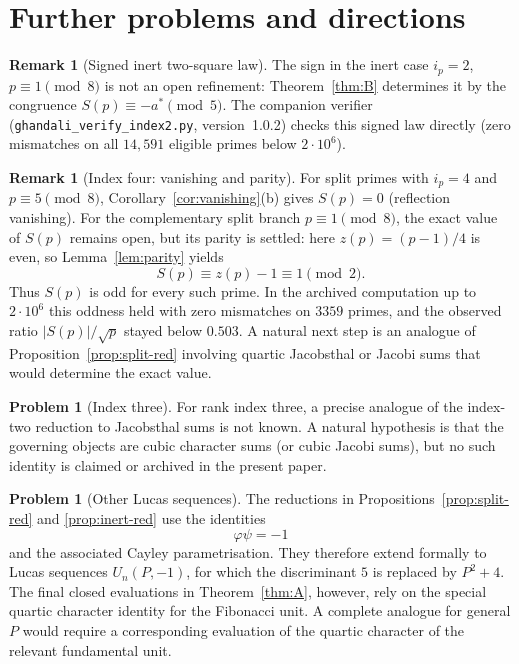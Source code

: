 \documentclass[11pt]{amsart}
\theoremstyle{plain}
\theoremstyle{definition}
\newtheorem{remark}[theorem]{Remark}
\newtheorem{problem}[theorem]{Problem}
\begin{document}
\section{Further problems and directions}\label{sec:open}

\begin{remark}[Signed inert two-square law]
The sign in the inert case \(i_p=2\), \(p\equiv1\pmod8\) is not an
open refinement: Theorem~\ref{thm:B} determines it by the congruence
\(S(p)\equiv-a^{*}\pmod5\).  The companion verifier (\texttt{ghandali\_verify\_index2.py}, version~1.0.2) checks this signed
law directly (zero mismatches on all \(14{,}591\) eligible primes below
\(2\cdot10^{6}\)).
\end{remark}

\begin{remark}[Index four: vanishing and parity]\label{rem:index-four}
For split primes with \(i_p=4\) and \(p\equiv5\pmod8\), Corollary~\ref{cor:vanishing}(b)
gives \(S(p)=0\) (reflection vanishing). For the complementary split branch
\(p\equiv1\pmod8\), the exact value of \(S(p)\) remains open, but its parity is
settled: here \(z(p)=(p-1)/4\) is even, so Lemma~\ref{lem:parity} yields
\[
  S(p)\equiv z(p)-1\equiv1\pmod2.
\]
Thus \(S(p)\) is odd for every such prime. In the archived computation up to
\(2\cdot10^{6}\) this oddness held with zero mismatches on \(3359\) primes, and
the observed ratio \(\lvert S(p)\rvert/\sqrt p\) stayed below \(0.503\). A natural
next step is an analogue of Proposition~\ref{prop:split-red} involving
quartic Jacobsthal or Jacobi sums that would determine the exact value.
\end{remark}

\begin{problem}[Index three]\label{prob:index-three}
For rank index three, a precise analogue of the index-two reduction to
Jacobsthal sums is not known. A natural hypothesis is that the governing
objects are cubic character sums (or cubic Jacobi sums), but no such
identity is claimed or archived in the present paper.
\end{problem}


\begin{problem}[Other Lucas sequences]\label{prob:other-lucas}
The reductions in Propositions~\ref{prop:split-red} and
\ref{prop:inert-red} use the identities
\[
  \varphi\psi=-1
\]
and the associated Cayley parametrisation.  They therefore extend
formally to Lucas sequences \(U_n(P,-1)\), for which the discriminant
\(5\) is replaced by \(P^2+4\).  The final closed evaluations in
Theorem~\ref{thm:A}, however, rely on the special quartic character
identity for the Fibonacci unit.  A complete analogue for general \(P\)
would require a corresponding evaluation of the quartic character of
the relevant fundamental unit.
\end{problem}
\end{document}
